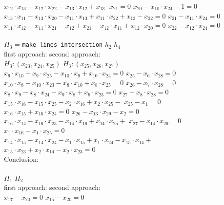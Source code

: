 \documentclass[final,1p,times,authoryear]{elsarticle}
\begin{document}
\begin{footnotesize}
\begin{tabbing}
\>\> $x_{12}\cdot x_{13}  -  x_{12}\cdot x_{22}  -  x_{13}\cdot x_{12}  +  x_{13}\cdot x_{21} = 0$ \>\>   $x_{20}  -  x_{10}\cdot x_{24}  -1 = 0$ \\
\>\> $x_{13}\cdot x_{11}  -  x_{13}\cdot x_{20}  -  x_{11}\cdot x_{13}  +  x_{11}\cdot x_{22}  +  x_{13}  -  x_{22} = 0$ \>\> $x_{21}  -  x_{11}\cdot x_{24} = 0$ \\
\>\> $x_{11}\cdot x_{12}  -  x_{11}\cdot x_{21}  -  x_{12}  +  x_{21}  -  x_{12}\cdot x_{11}  +  x_{12}\cdot x_{20} = 0$ \>\>   $x_{22}  -  x_{12}\cdot x_{24} = 0$ \\
\\
\> $H_3$ = {\tt make\_lines\_intersection} $h_2$ $h_4$ \\
\>\> first approach: \>\> second approach: \\
\>\> $H_3 : (x_{23}, x_{24}, x_{25})$  \>\>  $H_3 : (x_{25}, x_{26}, x_{27})$ \\
\>\> $x_9\cdot x_{10}  -  x_9\cdot x_{25}  -  x_{10}\cdot x_9  +  x_{10}\cdot x_{24} = 0$  \>\> $x_{25}  -  x_6\cdot x_{28} = 0$ \\
\>\> $x_{10}\cdot x_8  -  x_{10}\cdot x_{23}  -  x_8\cdot x_{10}  +  x_8\cdot x_{25} = 0$ \>\>  $x_{26}  -  x_7\cdot x_{28} = 0$ \\
\>\> $x_8\cdot x_9  -  x_8\cdot x_{24}  -  x_9\cdot x_8  +  x_9\cdot x_{23} = 0$ \>\>  $x_{27}  -  x_8\cdot x_{28} = 0$ \\
\>\> $x_{15}\cdot x_{16}  -  x_{15}\cdot x_{25}  -  x_2\cdot x_{16}  +  x_2\cdot x_{25}  -$ \>\>  $x_{25}  -  x_1 = 0$ \\
\>\>\> $x_{16}\cdot x_{15}  +  x_{16}\cdot x_{24} = 0$ \>  $x_{26}  -  x_{13}\cdot x_{29}  -  x_2 = 0$ \\
\>\> $x_{16}\cdot x_{14}  -  x_{16}\cdot x_{23}  -  x_{14}\cdot x_{16}  +  x_{14}\cdot x_{25}  +$ \>\>  $x_{27}  -  x_{14}\cdot x_{29} = 0$ \\
\>\>\>$x_1\cdot x_{16}  -  x_1\cdot x_{25} = 0$ \\
\>\> $x_{14}\cdot x_{15}  -  x_{14}\cdot x_{24}  -  x_1\cdot x_{15}  +  x_1\cdot x_{24}  -  x_{15}\cdot x_{14}  +$ \\
\>\>\> $x_{15}\cdot x_{23}  +  x_2\cdot x_{14}  -  x_2\cdot x_{23} = 0$ \\
Conclusion:\\
\\
 $H_1$ $H_2$ \\
\>\> first approach: \>\> second approach: \\
\>\> $x_{17}  -  x_{20} = 0$ \>\>  $x_{15}  -  x_{20} = 0$ \\

\end{tabbing}
\end{footnotesize}
\end{document}
